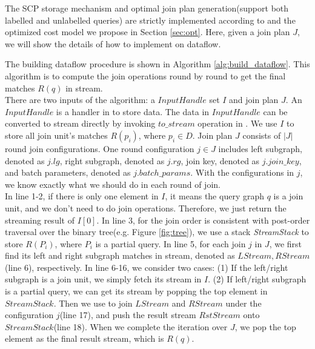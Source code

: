   The SCP storage mechanism and optimal join plan generation(support both labelled and unlabelled queries) are strictly implemented according to \cite{Lai2016} and the optimized cost model we propose in Section \ref{sec:opt}. Here, given a join plan $J$, we will show the details of how to implement \gencliqjoin on \timely dataflow. 

 The building \timely dataflow procedure is shown in Algorithm \ref{alg:build_dataflow}. This algorithm is to compute the join operations round by round to get the final matches $R(q)$ in stream.\\

There are two inputs of the algorithm: a $InputHandle$ set $I$ and join plan $J$. An $InputHandle$ is a handler in \timely to store data. The data in $InputHandle$ can be converted to stream directly by invoking $to\_stream$ operation in \timely. We use $I$ to store all join unit's matches $R(p_i)$, where $p_i \in D$. Join plan $J$ consists of $|J|$ round join configurations. One round configuration $j\in J$ includes left subgraph, denoted as $j.lg$, right subgraph, denoted as $j.rg$, join key, denoted as $j.join\_key$, and batch parameters, denoted as $j.batch\_params$. With the configurations in $j$, we know exactly what we should do in each round of join. \\

In line 1-2, if there is only one element in $I$, it means the query graph $q$ is a join unit, and we don't need to do join operations. Therefore, we just return the streaming result of $I[0]$. In line 3, for the join order is consistent with post-order traversal over the binary tree(e.g. Figure \ref{fig:tree}), we use a stack \textit{StreamStack} to store $R(P_i)$, where $P_i$ is a partial query. In line 5, for each join $j$ in $J$, we first find its left and right subgraph matches in stream, denoted as $LStream, RStream$(line 6), respectively. In line 6-16, we consider two cases: (1) If the left/right subgraph is a join unit, we simply fetch its stream in $I$. (2) If left/right subgraph is a partial query, we can get its stream by popping the top element in $StreamStack$. Then we use  to join $LStream$ and $RStream$ under the configuration $j$(line 17), and push the result stream $RstStream$ onto $StreamStack$(line 18). When we complete the iteration over $J$, we pop the top element as the final result stream, which is $R(q)$.

